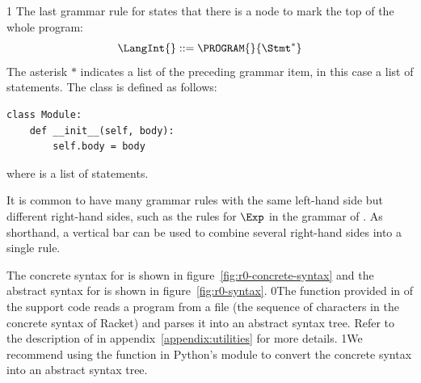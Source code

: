 \documentclass[7x10]{TimesAPriori_MIT}%
\def\racketEd{0}
\def\pythonEd{1}
\def\edition{1}
\newcommand{\racket}[1]{{\if\edition\racketEd{#1}\fi}}
\newcommand{\pythonColor}[0]{}
\newcommand{\python}[1]{{\if\edition\pythonEd\pythonColor #1\fi}}
\numberwithin{theorem}{chapter}
\numberwithin{definition}{chapter}
\numberwithin{equation}{chapter}
\begin{document}
{\if\edition\pythonEd\pythonColor
The last grammar rule for \LangInt{} states that there is a
 node to mark the top of the whole program:
\[
  \LangInt{} ::= \PROGRAM{}{\Stmt^{*}}
\]
The asterisk $*$ indicates a list of the preceding grammar item, in
this case a list of statements.
%
The  class is defined as follows:
\begin{lstlisting}
class Module:
    def __init__(self, body):
        self.body = body
\end{lstlisting}
where  is a list of statements.
\fi}

It is common to have many grammar rules with the same left-hand side
but different right-hand sides, such as the rules for $\Exp$ in the
grammar of \LangInt{}. As shorthand, a vertical bar can be used to
combine several right-hand sides into a single rule.

The concrete syntax for \LangInt{} is shown in
figure~\ref{fig:r0-concrete-syntax} and the abstract syntax for
\LangInt{} is shown in figure~\ref{fig:r0-syntax}.%
%
\racket{The  function provided in
  \code{utilities.rkt} of the support code reads a program from a file
  (the sequence of characters in the concrete syntax of Racket) and
  parses it into an abstract syntax tree. Refer to the description of
  \code{read-program} in appendix~\ref{appendix:utilities} for more
  details.}
%
\python{We recommend using the  function in Python's
  \code{ast} module to convert the concrete syntax into an abstract
  syntax tree.}

\newcommand{\LintGrammarRacket}{
  \begin{array}{rcl}
    \Type &::=& \key{Integer} \\
    \Exp{} &::=& \Int{} \MID \CREAD \MID \CNEG{\Exp} \MID \CADD{\Exp}{\Exp}
      \MID \CSUB{\Exp}{\Exp}
  \end{array}
}
\newcommand{\LintASTRacket}{
  \begin{array}{rcl}
    \Type &::=& \key{Integer} \\
    \Exp{} &::=& \INT{\Int} \MID \READ{} \\
           &\MID& \NEG{\Exp} \MID \ADD{\Exp}{\Exp} \MID \SUB{\Exp}{\Exp}
  \end{array}
}
\newcommand{\LintGrammarPython}{
\begin{array}{rcl}
  \Exp &::=& \Int \MID \key{input\_int}\LP\RP \MID \key{-}\;\Exp \MID \Exp \; \key{+} \; \Exp \MID \Exp \; \key{-} \; \Exp \MID \LP\Exp\RP \\
  \Stmt &::=& \key{print}\LP \Exp \RP \MID \Exp
\end{array}
}
\newcommand{\LintASTPython}{
  \begin{array}{rcl}
  \Exp{} &::=& \INT{\Int} \MID \READ{} \\
         &\MID& \UNIOP{\key{USub()}}{\Exp} \MID \BINOP{\Exp}{\key{Add()}}{\Exp}\\
         &\MID& \BINOP{\Exp}{\key{Sub()}}{\Exp}\\
  \Stmt{} &::=& \PRINT{\Exp} \MID \EXPR{\Exp} 
\end{array}
}
\end{document}
